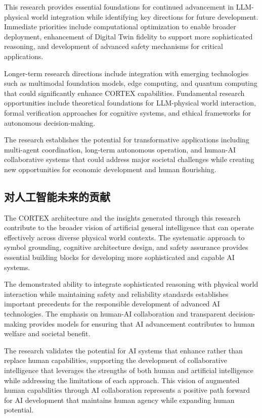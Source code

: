 This research provides essential foundations for continued advancement in LLM-physical world integration while identifying key directions for future development. Immediate priorities include computational optimization to enable broader deployment, enhancement of Digital Twin fidelity to support more sophisticated reasoning, and development of advanced safety mechanisms for critical applications.

Longer-term research directions include integration with emerging technologies such as multimodal foundation models, edge computing, and quantum computing that could significantly enhance CORTEX capabilities. Fundamental research opportunities include theoretical foundations for LLM-physical world interaction, formal verification approaches for cognitive systems, and ethical frameworks for autonomous decision-making.

The research establishes the potential for transformative applications including multi-agent coordination, long-term autonomous operation, and human-AI collaborative systems that could address major societal challenges while creating new opportunities for economic development and human flourishing.

\subsection{对人工智能未来的贡献}

The CORTEX architecture and the insights generated through this research contribute to the broader vision of artificial general intelligence that can operate effectively across diverse physical world contexts. The systematic approach to symbol grounding, cognitive architecture design, and safety assurance provides essential building blocks for developing more sophisticated and capable AI systems.

The demonstrated ability to integrate sophisticated reasoning with physical world interaction while maintaining safety and reliability standards establishes important precedents for the responsible development of advanced AI technologies. The emphasis on human-AI collaboration and transparent decision-making provides models for ensuring that AI advancement contributes to human welfare and societal benefit.

The research validates the potential for AI systems that enhance rather than replace human capabilities, supporting the development of collaborative intelligence that leverages the strengths of both human and artificial intelligence while addressing the limitations of each approach. This vision of augmented human capabilities through AI collaboration represents a positive path forward for AI development that maintains human agency while expanding human potential.

